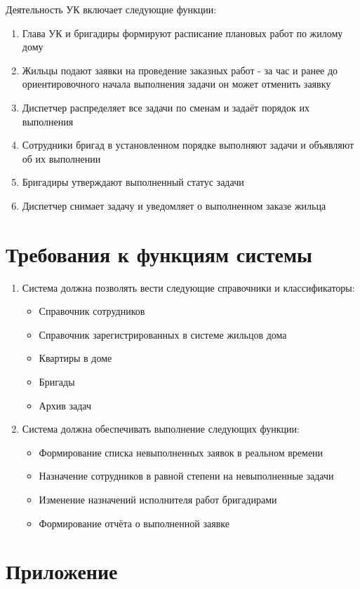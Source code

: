 Деятельность УК включает следующие функции:
\begin{enumerate}
\item Глава УК и бригадиры формируют расписание плановых работ по жилому дому
\item Жильцы подают заявки на проведение заказных работ - за час и ранее до ориентировочного начала выполнения задачи он может отменить заявку
\item Диспетчер распределяет все задачи по сменам и задаёт порядок их выполнения 
\item Сотрудники бригад в установленном порядке выполняют задачи и объявляют об их выполнении
\item Бригадиры утверждают выполненный статус задачи
\item Диспетчер снимает задачу и уведомляет о выполненном заказе жильца
\end{enumerate}

\section{Требования к функциям системы}

\begin{enumerate}
\item Система должна позволять вести следующие справочники и классификаторы:
\begin{itemize}
\item Справочник сотрудников
\item Справочник зарегистрированных в системе жильцов дома
\item Квартиры в доме
\item Бригады
\item Архив задач
\end{itemize}
\item Система должна обеспечивать выполнение следующих функции:
\begin{itemize}
\item Формирование списка невыполненных заявок в реальном времени
\item Назначение сотрудников в равной степени на невыполненные задачи 
\item Изменение назначений исполнителя работ бригадирами
\item Формирование отчёта о выполненной заявке
\end{itemize}
\end{enumerate}


\section{Приложение}

